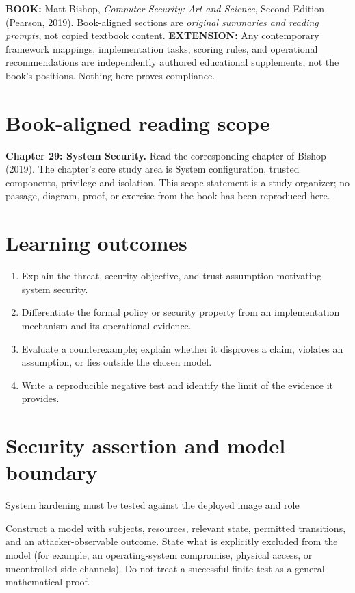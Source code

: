 \documentclass[10pt,letterpaper]{article}
\begin{document}
\makedoctocpage
\begin{notebox}
\textbf{BOOK:} Matt Bishop, \emph{Computer Security: Art and Science}, Second Edition (Pearson, 2019). Book-aligned sections are \emph{original summaries and reading prompts}, not copied textbook content.
\textbf{EXTENSION:} Any contemporary framework mappings, implementation tasks, scoring rules, and operational recommendations are independently authored educational supplements, not the book's positions. Nothing here proves compliance.
\end{notebox}
\section{Book-aligned reading scope}
\textbf{Chapter 29: System Security.} Read the corresponding chapter of Bishop (2019). The chapter's core study area is System configuration, trusted components, privilege and isolation. This scope statement is a study organizer; no passage, diagram, proof, or exercise from the book has been reproduced here.
\section{Learning outcomes}
\begin{enumerate}
\item Explain the threat, security objective, and trust assumption motivating system security.
\item Differentiate the formal policy or security property from an implementation mechanism and its operational evidence.
\item Evaluate a counterexample; explain whether it disproves a claim, violates an assumption, or lies outside the chosen model.
\item Write a reproducible negative test and identify the limit of the evidence it provides.
\end{enumerate}
\section{Security assertion and model boundary}
\begin{infobox}
System hardening must be tested against the deployed image and role
\end{infobox}
Construct a model with subjects, resources, relevant state, permitted transitions, and an attacker-observable outcome. State what is explicitly excluded from the model (for example, an operating-system compromise, physical access, or uncontrolled side channels). Do not treat a successful finite test as a general mathematical proof.
\end{document}
